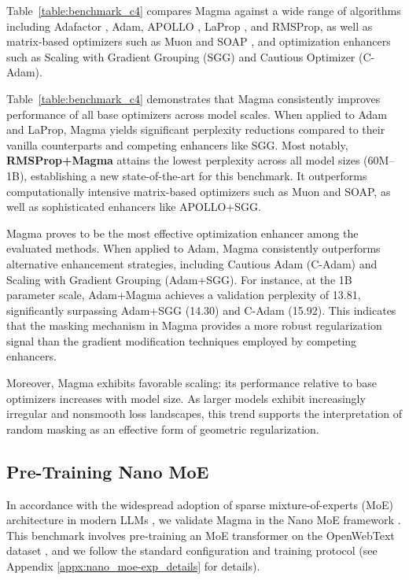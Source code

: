 \documentclass[11pt, a4paper, twocolumn, copyright, goog]{google}
\theoremstyle{plain}
\theoremstyle{definition}
\theoremstyle{remark}
\begin{document}
Table~\ref{table:benchmark_c4} compares Magma against a wide range of algorithms including Adafactor \citep{shazeer2018adafactor}, Adam, APOLLO \citep{zhu2025apollo}, LaProp \citep{ziyin2020laprop}, and RMSProp, as well as matrix-based optimizers such as Muon and SOAP \citep{vyas2024soap}, and optimization enhancers such as Scaling with Gradient Grouping (SGG) \citep{li-etal-2025-taming} and Cautious Optimizer (C-Adam).

Table~\ref{table:benchmark_c4} demonstrates that Magma consistently improves performance of all base optimizers across model scales. 
When applied to Adam and LaProp, Magma yields significant perplexity reductions compared to their vanilla counterparts and competing enhancers like SGG. Most notably, \textbf{RMSProp+Magma} attains the lowest perplexity across all model sizes (60M--1B), establishing a new state-of-the-art for this benchmark. It outperforms computationally intensive matrix-based optimizers such as Muon and SOAP, as well as sophisticated enhancers like APOLLO+SGG.

Magma proves to be the most effective optimization enhancer among the evaluated methods. When applied to Adam, Magma consistently outperforms alternative enhancement strategies, including Cautious Adam (C-Adam) and Scaling with Gradient Grouping (Adam+SGG). For instance, at the 1B parameter scale, Adam+Magma achieves a validation perplexity of 13.81, significantly surpassing Adam+SGG (14.30) and C-Adam (15.92). This indicates that the masking mechanism in Magma provides a more robust regularization signal than the gradient modification techniques employed by competing enhancers.


Moreover, Magma exhibits favorable scaling: its performance relative to base optimizers increases with model size. As larger models exhibit increasingly irregular and nonsmooth loss landscapes, this trend supports the interpretation of random masking as an effective form of geometric regularization.




\subsection{Pre-Training Nano MoE}
In accordance with the widespread adoption of sparse mixture-of-experts (MoE) architecture in modern LLMs \citep{shazeer2017outrageously,lepikhin2020gshard,fedus2022switch,du2022glam}, we validate Magma in the Nano MoE framework \citep{wolfe2024nanomoe}.
This benchmark involves pre-training an MoE transformer on the OpenWebText dataset \citep{pile}, and we follow the standard configuration and training protocol (see Appendix \ref{appx:nano_moe-exp_details} for details).
\end{document}
